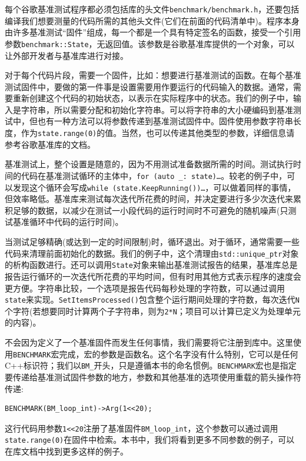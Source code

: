 每个谷歌基准测试程序都必须包括库的头文件\texttt{benchmark/benchmark.h}，还要包括编译我们想要测量的代码所需的其他头文件(它们在前面的代码清单中)。程序本身由许多基准测试“固件”组成，每一个都是一个具有特定签名的函数，接受一个引用参数\texttt{benchmark::State}，无返回值。该参数是谷歌基准库提供的一个对象，可以让外部开发者与基准库进行对接。

对于每个代码片段，需要一个固件，比如：想要进行基准测试的函数。在每个基准测试固件中，要做的第一件事是设置需要用作要运行的代码输入的数据。通常，需要重新创建这个代码的初始状态，以表示在实际程序中的状态。我们的例子中，输入是字符串，所以需要分配和初始化字符串。可以将字符串的大小硬编码到基准测试中，但也有一种方法可以将参数传递到基准测试固件中。固件使用参数字符串长度，作为\texttt{state.range(0)}的值。当然，也可以传递其他类型的参数，详细信息请参考谷歌基准库的文档。

基准测试上，整个设置是随意的，因为不用测试准备数据所需的时间。测试执行时间的代码在基准测试循环的主体中，\texttt{for (auto \_: state){…}}。较老的例子中，可以发现这个循环会写成\texttt{while (state.KeepRunning()){…}}，可以做着同样的事情，但效率略低。基准库来测试每次迭代所花费的时间，并决定要进行多少次迭代来累积足够的数据，以减少在测试一小段代码的运行时间时不可避免的随机噪声(只测试基准循环中代码的运行时间)。

当测试足够精确(或达到一定的时间限制)时，循环退出。对于循环，通常需要一些代码来清理前面初始化的数据。我们的例子中，这个清理由\texttt{std::unique\_ptr}对象的析构函数进行。还可以调用\texttt{State}对象来输出基准测试报告的结果，基准库总是报告运行循环的一次迭代所花费的平均时间，但有时用其他方式表示程序的速度会更方便。字符串比较，一个选项是报告代码每秒处理的字符数，可以通过调用\texttt{state}来实现。\texttt{SetItemsProcessed()}包含整个运行期间处理的字符数，每次迭代\texttt{N}个字符(若想要同时计算两个子字符串，则为\texttt{2*N}；项目可以计算已定义为处理单元的内容)。

不会因为定义了一个基准固件而发生任何事情，我们需要将它注册到库中。这里使用\texttt{BENCHMARK}宏完成，宏的参数是函数名。这个名字没有什么特别，它可以是任何C++标识符；我们以\texttt{BM\_}开头，只是遵循本书的命名惯例。\texttt{BENCHMARK}宏也是指定要传递给基准测试固件参数的地方，参数和其他基准的选项使用重载的箭头操作符传递:

\begin{lstlisting}[style=styleCXX]
BENCHMARK(BM_loop_int)->Arg(1<<20);
\end{lstlisting}

这行代码用参数\texttt{1<<20}注册了基准固件\texttt{BM\_loop\_int}，这个参数可以通过调用\texttt{state.range(0)}在固件中检索。本书中，我们将看到更多不同参数的例子，可以在库文档中找到更多这样的例子。

